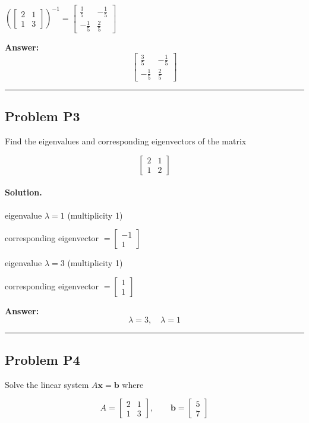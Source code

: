 \documentclass[12pt, a4paper]{article}
\newcommand{\problem}[1]{\subsection*{Problem #1}}
\newcommand{\solution}{\paragraph{Solution.}}
\begin{document}
$\left(\left[\begin{matrix}2 & 1\\1 & 3\end{matrix}\right]\right)^{-1} = \left[\begin{matrix}\frac{3}{5} & - \frac{1}{5}\\- \frac{1}{5} & \frac{2}{5}\end{matrix}\right]$

\textbf{Answer:}
\[\boxed{\left[\begin{matrix}\frac{3}{5} & - \frac{1}{5}\\- \frac{1}{5} & \frac{2}{5}\end{matrix}\right]}\]

\vspace{1em}
\hrule
\vspace{1em}

\problem{P3}

Find the eigenvalues and corresponding eigenvectors of the matrix

$$\begin{bmatrix}2 & 1\\1 & 2\end{bmatrix}$$

\solution

eigenvalue $\lambda = 1$ (multiplicity 1)

corresponding eigenvector $= \left[\begin{matrix}-1\\1\end{matrix}\right]$

eigenvalue $\lambda = 3$ (multiplicity 1)

corresponding eigenvector $= \left[\begin{matrix}1\\1\end{matrix}\right]$

\textbf{Answer:}
\[\boxed{\lambda = 3,\quad \lambda = 1}\]

\vspace{1em}
\hrule
\vspace{1em}

\problem{P4}

Solve the linear system $A\mathbf{x} = \mathbf{b}$ where

$$A = \begin{bmatrix}2 & 1\\1 & 3\end{bmatrix},\qquad \mathbf{b} = \begin{bmatrix}5\\7\end{bmatrix}$$
\end{document}
